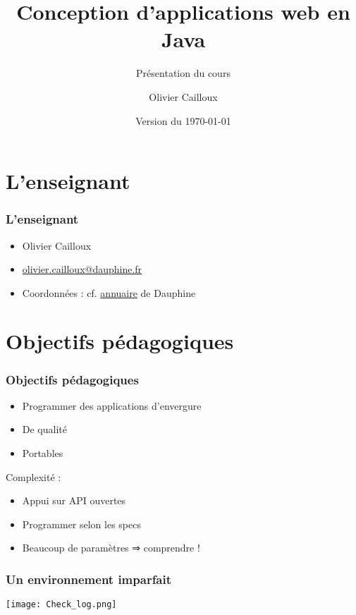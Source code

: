 \documentclass[english, french]{beamer}
\title{Conception d’applications web en Java}
\subtitle{Présentation du cours}
\author{Olivier Cailloux}
\institute[LAMSADE]{LAMSADE, Université Paris-Dauphine}
\date{Version du \today}
\begin{document}


\begin{frame}[plain]
   \titlepage
\end{frame}
\addtocounter{framenumber}{-1}

\section{L’enseignant}
\begin{frame}
	\frametitle{L’enseignant}
	\begin{itemize}
		\item Olivier Cailloux
		\item \href{mailto:olivier.cailloux@dauphine.fr}{olivier.cailloux@dauphine.fr}
		\item Coordonnées : cf. \href{https://www.ent.dauphine.fr/Annuaire/index.php?param0=fiche&param1=ocailloux}{annuaire} de Dauphine
	\end{itemize}
\end{frame}

\section[Obj. pédagogiques]{Objectifs pédagogiques}
\begin{frame}
	\frametitle{Objectifs pédagogiques}
	\begin{itemize}
		\item Programmer des applications d’envergure
		\item De qualité
		\item Portables
	\end{itemize}
	Complexité :
	\begin{itemize}
		\item Appui sur API ouvertes
		\item Programmer selon les specs
		\item Beaucoup de paramètres ⇒ comprendre !
	\end{itemize}
\end{frame}

\begin{frame}[fragile]
	\frametitle{Un environnement imparfait}
	\begin{minipage}{\columnwidth+15mm}
	\hspace{-8mm}%
	\texttt{[image: Check\_log.png]}%
	\end{minipage}
\end{frame}
\end{document}
